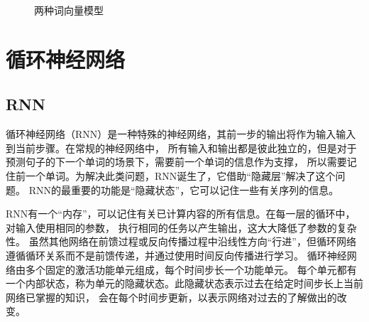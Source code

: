 \begin{figure}[htbp]
  \centering
  \caption{两种词向量模型\cite{mikolov2013distributed}}
  \end{figure}

\section{循环神经网络}

\subsection{RNN}

循环神经网络（RNN）是一种特殊的神经网络，其前一步的输出将作为输入输入到当前步骤\cite{zaremba2014recurrent}。在常规的神经网络中，
所有输入和输出都是彼此独立的，但是对于预测句子的下一个单词的场景下，需要前一个单词的信息作为支撑，
所以需要记住前一个单词。为解决此类问题，RNN诞生了，它借助“隐藏层”解决了这个问题。
RNN的最重要的功能是“隐藏状态”，它可以记住一些有关序列的信息。

RNN有一个“内存”，可以记住有关已计算内容的所有信息。在每一层的循环中，对输入使用相同的参数，
执行相同的任务以产生输出，这大大降低了参数的复杂性\cite{liu2016recurrent}。
虽然其他网络在前馈过程或反向传播过程中沿线性方向“行进”，但循环网络遵循循环关系而不是前馈传递，并通过使用时间反向传播进行学习。
循环神经网络由多个固定的激活功能单元组成，每个时间步长一个功能单元。
每个单元都有一个内部状态，称为单元的隐藏状态。此隐藏状态表示过去在给定时间步长上当前网络已掌握的知识，
会在每个时间步更新，以表示网络对过去的了解做出的改变。

